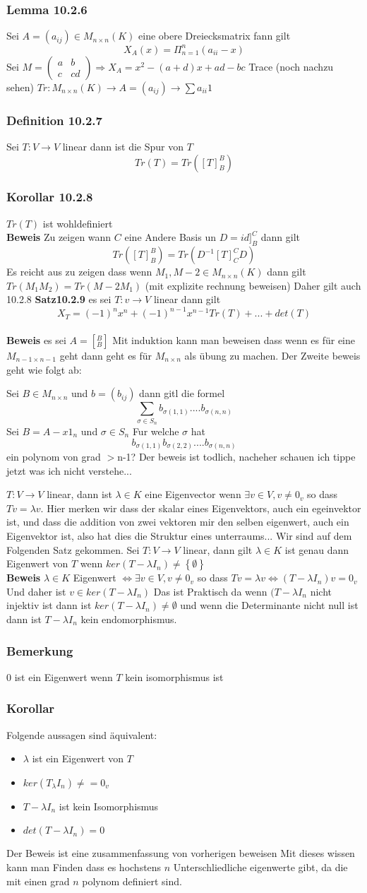 \documentclass{article}
\newcommand{\korollar}[1]{\subsubsection*{Korollar {#1}}}
\newcommand{\beweis}{\\\textbf{Beweis }}
\newcommand{\bemerkung}[1]{\subsubsection*{Bemerkung {#1}}}
\newcommand{\lemma}[1]{\subsubsection*{Lemma {#1}}}
\newcommand{\definition}[1]{\subsubsection*{Definition {#1}}}
\begin{document}
\lemma{10.2.6}Sei $A=(a_{ij})\in M_{n\times n}(K)$ eine obere Dreiecksmatrix fann gilt \[X_A(x)=\Pi_{n=1}^n(a_{ii}-x)\]
Sei $M=\begin{pmatrix}a&b\\c&cd\end{pmatrix} \Rightarrow X_A=x^2-(a+d)x+ad-bc$
 Trace (noch nachzu sehen) $Tr:M_{n\times n}(K)\rightarrow A=(a_{ij})\rightarrow\sum a_{ii}1$
\definition{10.2.7} Sei $T:V\rightarrow V$ linear dann ist die Spur von $T$ \[Tr(T)=Tr([T]^B_B)\]
\korollar{10.2.8} $Tr(T)$ ist wohldefiniert
\beweis Zu zeigen wann $C$ eine Andere Basis un $D=id]^C_B$ dann gilt \[Tr([T]^B_B)=Tr(D^{-1}[T]^C_CD)\]
Es reicht aus zu zeigen dass wenn $M_1,M-2\in M_{n\times n}(K)$ dann gilt $Tr(M_1M_2)=Tr(M-2M_1)$ (mit explizite rechnung beweisen)
Daher gilt auch 10.2.8
\textbf{Satz10.2.9} es sei $T:v\rightarrow V$ linear dann gilt \[X_T=(-1)^nx^n+(-1)^{n-1}x^{n-1}Tr(T)+...+det(T)\]
\beweis es sei $A=[^B_B]$ Mit induktion kann man beweisen dass wenn es für eine $M_{n-1\times n-1}$ geht dann geht es für $M_{n\times n}$ als übung  zu machen.
Der Zweite beweis geht wie folgt ab:

Sei $B\in M_{n\times n}$ und $b=(b_{ij})$ dann gitl die formel
\[\sum_{\sigma\in S_n}b_{\sigma(1,1)}....b_{\sigma(n,n)}\]
Sei $B=A-x1_n$ und $\sigma\in S_n$ Fur welche $\sigma$ hat \[b_{\sigma(1,1)}b_{\sigma(2,2)}....b_{\sigma(n,n)}\] ein polynom von grad $>$n-1?
Der beweis ist todlich, nacheher schauen ich tippe jetzt was ich nicht verstehe...

$T:V\rightarrow V$ linear, dann ist $\lambda \in K$ eine Eigenvector wenn $\exists v\in V,v\neq 0_v$ so dass $Tv=\lambda v$. Hier merken wir dass der skalar eines Eigenvektors, auch ein egeinvektor ist, und dass die addition von zwei vektoren mir den selben eigenwert, auch ein Eigenvektor ist, also hat dies die Struktur eines unterraums...
Wir sind auf dem Folgenden Satz gekommen. Sei $T:V\rightarrow V$ linear, dann gilt $\lambda \in K$ ist genau dann Eigenwert von $T$ wenn $ker(T-\lambda I_n)\neq\left\lbrace\emptyset\right\rbrace$
\beweis $\lambda \in K$ Eigenwert $\Leftrightarrow \exists v\in V, v\neq 0_v$ so dass $Tv=\lambda v\Leftrightarrow (T-\lambda I_n)v=0_v$ Und daher ist $v\in ker(T-\lambda I_n)$ 
 Das ist Praktisch da wenn $(T-\lambda I_n$ nicht injektiv ist dann ist $ker(T-\lambda I_n)\neq \emptyset$ und wenn die Determinante nicht null ist dann ist $T-\lambda I_n$ kein endomorphismus.
 \bemerkung{} 0 ist ein Eigenwert wenn $T$ kein isomorphismus ist
\korollar{} Folgende aussagen sind äquivalent: \begin{itemize}
\item{$\lambda$ ist ein Eigenwert von $T$}
\item{$ker(T_\lambda I_n)\neq =0_v$}
\item{$T-\lambda I_n$ ist kein Isomorphismus}
\item{$det(T-\lambda I_n)=0$}
\end{itemize}
Der Beweis ist eine zusammenfassung von vorherigen beweisen
 Mit dieses wissen kann man Finden dass es hochstens $n$ Unterschliedliche eigenwerte gibt, da die mit einen grad $n$ polynom definiert sind.
\end{document}

